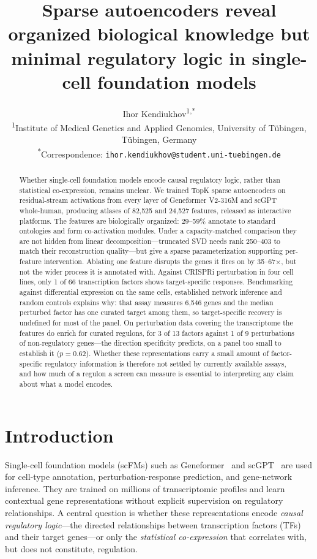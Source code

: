 \documentclass[onecolumn,11pt]{article}
\title{\textbf{Sparse autoencoders reveal organized biological knowledge but minimal
regulatory logic in single-cell foundation models}}
\author{Ihor Kendiukhov\textsuperscript{1,*}\\[6pt]
\textsuperscript{1}Institute of Medical Genetics and Applied Genomics, University of T\"ubingen, T\"ubingen, Germany\\
\textsuperscript{*}Correspondence: \texttt{ihor.kendiukhov@student.uni-tuebingen.de}}
\date{}
\begin{document}
\maketitle

\begin{abstract}
Whether single-cell foundation models encode causal regulatory logic, rather than statistical
co-expression, remains unclear. We trained TopK sparse
autoencoders on residual-stream activations from every layer of Geneformer V2-316M and scGPT
whole-human, producing atlases of 82,525 and 24,527 features, released as interactive platforms. The features are biologically organized: 29--59\% annotate to standard ontologies and form
co-activation modules. Under a capacity-matched comparison they are not hidden from linear decomposition---truncated SVD
needs rank 250--403 to match their reconstruction quality---but give a sparse parameterization
supporting per-feature intervention. Ablating one feature disrupts the genes it fires on by 35--67$\times$, but not the wider
process it is annotated with. Against CRISPRi perturbation in four cell lines,
only 1 of 66 transcription factors shows target-specific responses. Benchmarking against differential expression on the same cells, established network inference and
random controls explains why: that assay measures 6,546 genes and the median perturbed factor has
one curated target among them, so target-specific recovery is undefined for most of the panel. On perturbation data covering the transcriptome the
features do enrich for curated regulons, for 3 of 13 factors against 1 of 9 perturbations of
non-regulatory genes---the direction specificity predicts, on a panel too small to establish it
($p = 0.62$). Whether these representations carry a small amount of factor-specific
regulatory information is therefore not settled by currently available assays, and how much of a
regulon a screen can measure is essential to interpreting any claim about what a model encodes.
\end{abstract}

\section{Introduction}
Single-cell foundation models (scFMs) such as Geneformer~\cite{theodoris2023transfer} and
scGPT~\cite{cui2024scgpt} are used for cell-type annotation, perturbation-response prediction, and
gene-network inference. They are trained on millions of transcriptomic profiles and learn
contextual gene representations without explicit supervision on regulatory relationships. A central
question is whether these representations encode \emph{causal regulatory logic}---the directed
relationships between transcription factors (TFs) and their target genes---or only the
\emph{statistical co-expression} that correlates with, but does not constitute, regulation.
\end{document}
